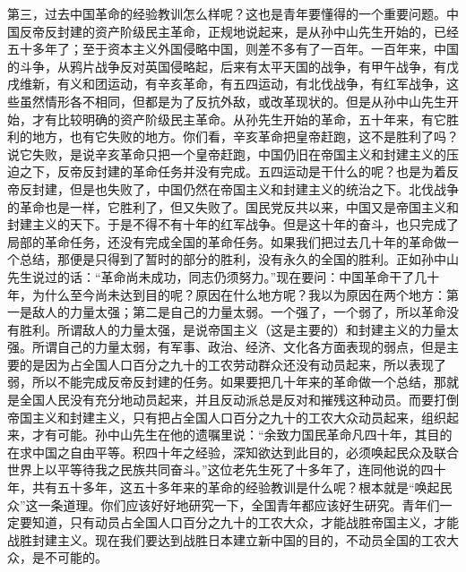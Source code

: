 第三，过去中国革命的经验教训怎么样呢？这也是青年要懂得的一个重要问题。中国反帝反封建的资产阶级民主革命，正规地说起来，是从孙中山先生开始的，已经五十多年了；至于资本主义外国侵略中国，则差不多有了一百年。一百年来，中国的斗争，从鸦片战争反对英国侵略起，后来有太平天国的战争，有甲午战争，有戊戌维新，有义和团运动，有辛亥革命，有五四运动，有北伐战争，有红军战争，这些虽然情形各不相同，但都是为了反抗外敌，或改革现状的。但是从孙中山先生开始，才有比较明确的资产阶级民主革命。从孙先生开始的革命，五十年来，有它胜利的地方，也有它失败的地方。你们看，辛亥革命把皇帝赶跑，这不是胜利了吗？说它失败，是说辛亥革命只把一个皇帝赶跑，中国仍旧在帝国主义和封建主义的压迫之下，反帝反封建的革命任务并没有完成。五四运动是干什么的呢？也是为着反帝反封建，但是也失败了，中国仍然在帝国主义和封建主义的统治之下。北伐战争的革命也是一样，它胜利了，但又失败了。国民党反共以来，中国又是帝国主义和封建主义的天下。于是不得不有十年的红军战争。但是这十年的奋斗，也只完成了局部的革命任务，还没有完成全国的革命任务。如果我们把过去几十年的革命做一个总结，那便是只得到了暂时的部分的胜利，没有永久的全国的胜利。正如孙中山先生说过的话：“革命尚未成功，同志仍须努力。”现在要问：中国革命干了几十年，为什么至今尚未达到目的呢？原因在什么地方呢？我以为原因在两个地方：第一是敌人的力量太强；第二是自己的力量太弱。一个强了，一个弱了，所以革命没有胜利。所谓敌人的力量太强，是说帝国主义（这是主要的）和封建主义的力量太强。所谓自己的力量太弱，有军事、政治、经济、文化各方面表现的弱点，但是主要的是因为占全国人口百分之九十的工农劳动群众还没有动员起来，所以表现了弱，所以不能完成反帝反封建的任务。如果要把几十年来的革命做一个总结，那就是全国人民没有充分地动员起来，并且反动派总是反对和摧残这种动员。而要打倒帝国主义和封建主义，只有把占全国人口百分之九十的工农大众动员起来，组织起来，才有可能。孙中山先生在他的遗嘱里说：“余致力国民革命凡四十年，其目的在求中国之自由平等。积四十年之经验，深知欲达到此目的，必须唤起民众及联合世界上以平等待我之民族共同奋斗。”这位老先生死了十多年了，连同他说的四十年，共有五十多年，这五十多年来的革命的经验教训是什么呢？根本就是“唤起民众”这一条道理。你们应该好好地研究一下，全国青年都应该好生研究。青年们一定要知道，只有动员占全国人口百分之九十的工农大众，才能战胜帝国主义，才能战胜封建主义。现在我们要达到战胜日本建立新中国的目的，不动员全国的工农大众，是不可能的。


